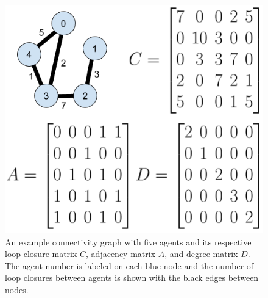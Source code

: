 \documentclass[letterpaper, 10 pt, conference]{ieeeconf}  %
\begin{document}
\begin{figure}
\centering
\includegraphics[width=0.8\linewidth]{figures/connectivity.png}
\caption{An example connectivity graph with five agents and its respective loop closure matrix $C$, adjacency matrix $A$, and degree matrix $D$. The agent number is labeled on each blue node and the number of loop closures between agents is shown with the black edges between nodes.
}
\label{fig:connectivity}
\end{figure}
\end{document}
